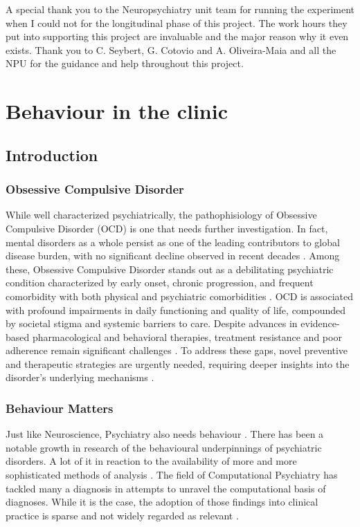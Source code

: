 \documentclass[11pt]{article}
\begin{document}
A special thank you to the Neuropsychiatry unit team for running the experiment when I could not for the longitudinal phase of this project. The work hours they put into supporting this project are invaluable and the major reason why it even exists. Thank you to C. Seybert, G. Cotovio and A. Oliveira-Maia and all the NPU for the guidance and help throughout this project.


\section{Behaviour in the clinic}
\subsection{Introduction}

\subsubsection{Obsessive Compulsive Disorder}

While well characterized psychiatrically, the pathophisiology of Obsessive Compulsive Disorder (OCD) is one that needs further investigation. In fact, mental disorders as a whole persist as one of the leading contributors to global disease burden, with no significant decline observed in recent decades \cite{gbd2022global}. Among these, Obsessive Compulsive Disorder stands out as a debilitating psychiatric condition characterized by early onset, chronic progression, and frequent comorbidity with both physical and psychiatric comorbidities \cite{katschnig2006quality}. OCD is associated with profound impairments in daily functioning and quality of life, compounded by societal stigma and systemic barriers to care. Despite advances in evidence-based pharmacological and behavioral therapies, treatment resistance and poor adherence remain significant challenges \cite{kellner2010drug}. To address these gaps, novel preventive and therapeutic strategies are urgently needed, requiring deeper insights into the disorder’s underlying mechanisms \cite{m2018promising}.

\subsubsection{Behaviour Matters}
Just like Neuroscience, Psychiatry also needs behaviour \cite{krakauer2017neuroscience}. There has been a notable growth in research of the behavioural underpinnings of psychiatric disorders. A lot of it in reaction to the availability of more and more sophisticated methods of analysis \cite{montague2012computational}. The field of Computational Psychiatry has tackled many a diagnosis in attempts to unravel the computational basis of diagnoses. While it is the case, the adoption of those findings into clinical practice is sparse and not widely regarded as relevant \cite{hitchcock2022computational}.
\end{document}
